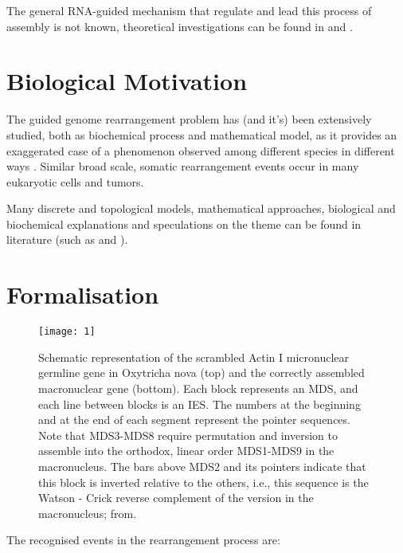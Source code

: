 The general RNA-guided mechanism that regulate and lead this process of assembly is not known, theoretical investigations can be found in \cite{Brijder2007} and \cite{Ehrenfeucht:2004:CLC:971120}.


\section{Biological Motivation}
The guided genome rearrangement problem has (and it's) been extensively \cite{Ehrenfeucht:2004:CLC:971120} studied, both as biochemical process and mathematical model, as it provides an exaggerated case of a phenomenon observed among different species in different ways \cite{ANGELESKA20093020}. Similar broad scale, somatic rearrangement events occur in many eukaryotic cells and tumors.

Many discrete and topological models, mathematical approaches, biological and biochemical explanations and speculations on the theme can be found in literature (such as \cite{prescott2001} \cite{Brijder2014} \cite{ANGELESKA2007706} and \cite{programmedgenome}).

\section{Formalisation}

\begin{figure}[h]
  \centering
    \texttt{[image: 1]}
  \caption{Schematic representation of the scrambled Actin I micronuclear germline gene in Oxytricha nova (top) and the correctly assembled macronuclear gene (bottom). Each block represents an MDS, and each line between blocks is an IES. The numbers at the beginning and at the end of each segment represent the pointer sequences. Note that MDS3-MDS8 require permutation and inversion to assemble into the orthodox, linear order MDS1-MDS9 in the macronucleus. The bars above MDS2 and its pointers indicate that this block is inverted relative to the others, i.e., this sequence is the Watson - Crick reverse complement of the version in the macronucleus; from\cite{prescottgreslin}.}

\end{figure}

The recognised events in the rearrangement process are:

